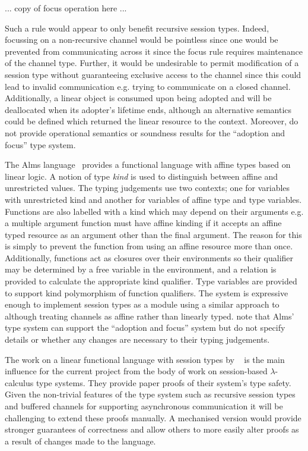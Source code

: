 \documentclass{mprop}
\begin{document}
... copy of focus operation here ...

Such a rule would appear to only benefit recursive session types. Indeed,
focussing on a non-recursive channel would be pointless since one would be
prevented from communicating across it since the focus rule requires
maintenance of the channel type. Further, it would be undesirable to permit
modification of a session type without guaranteeing exclusive access to the
channel since this could lead to invalid communication e.g. trying to
communicate on a closed channel. Additionally, a linear object is consumed
upon being adopted and will be deallocated when its adopter's lifetime ends,
although an alternative semantics could be defined which returned the linear
resource to the context. Moreover, \citeauthor{Fahndrich:2002} do not provide
operational semantics or soundness results for the ``adoption and focus'' type
system.

The Alms language~\cite{Aldrich:2009} provides a functional language with
affine types based on linear logic. A notion of type \textit{kind} is used to
distinguish between affine and unrestricted values. The typing judgements use
two contexts; one for variables with unrestricted kind and another for
variables of affine type and type variables. Functions are also labelled with
a kind which may depend on their arguments e.g. a multiple argument function
must have affine kinding if it accepts an affine typed resource as an argument
other than the final argument. The reason for this is simply to prevent the
function from using an affine resource more than once. Additionally, functions
act as closures over their environments so their qualifier may be determined
by a free variable in the environment, and a relation is provided to calculate
the appropriate kind qualifier. Type variables are provided to support kind
polymorphism of function qualifiers. The system is expressive enough to
implement session types as a module using a similar approach to
\citeauthor{Gay:2010:LAST}~\cite{Gay:2010:LAST} although treating channels as
affine rather than linearly typed. \citeauthor{Aldrich:2009} note that Alms'
type system can support the ``adoption and focus'' system but do not specify
details or whether any changes are necessary to their typing judgements.

The work on a linear functional language with session types by
\citeauthor{Gay:2010:LAST}~\cite{Gay:2010:LAST} is the main influence for the
current project from the body of work on session-based $\lambda$-calculus type
systems. They provide paper proofs of their system's type safety. Given the
non-trivial features of the type system such as recursive session types and
buffered channels for supporting asynchronous communication it will be
challenging to extend these proofs manually. A mechanised version would
provide stronger guarantees of correctness and allow others to more easily
alter proofs as a result of changes made to the language.
\end{document}
